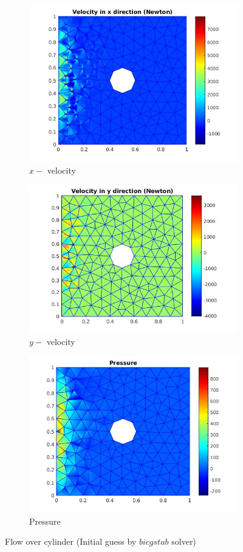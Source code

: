 \documentclass[a4paper,openany]{book}
\begin{document}
\begin{figure}
  \begin{subfigure}{\textwidth}
    \includegraphics[width=0.8\linewidth]{cylinder_newton_vx_bicgstab.jpg}
    \caption{$x-$ velocity }
  \label{x_vel_navier_stoke_bicgstab}
  \end{subfigure}
  \begin{subfigure}{\textwidth}
    \includegraphics[width=0.8\linewidth]{cylinder_newton_vy_bicgstab.jpg}
    \caption{$y-$ velocity}
  \label{y_vel_navier_stoke_bicgstab}
  \end{subfigure}
  \begin{subfigure}{\textwidth}
    \includegraphics[width=0.8\linewidth]{cylinder_newton_pressure_bicgstab.jpg}
    \caption{Pressure}
  \label{pressure_navier_stoke_bicgstab}
  \end{subfigure}
\caption{Flow over cylinder (Initial guess by $bicgstab$ solver)}
\label{flow_over_cylinder_bicgstab_n_s}
\end{figure}
\end{document}
